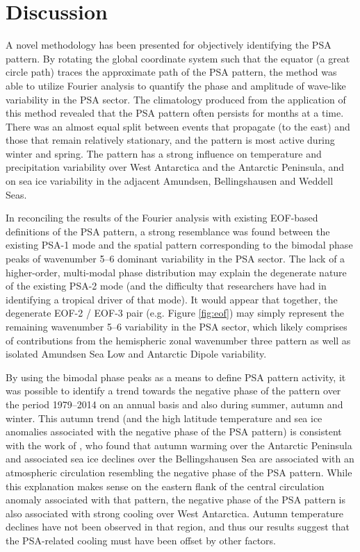 \section{Discussion}

A novel methodology has been presented for objectively identifying the PSA pattern. By rotating the global coordinate system such that the equator (a great circle path) traces the approximate path of the PSA pattern, the method was able to utilize Fourier analysis to quantify the phase and amplitude of wave-like variability in the PSA sector. The climatology produced from the application of this method revealed that the PSA pattern often persists for months at a time. There was an almost equal split between events that propagate (to the east) and those that remain relatively stationary, and the pattern is most active during winter and spring. The pattern has a strong influence on temperature and precipitation variability over West Antarctica and the Antarctic Peninsula, and on sea ice variability in the adjacent Amundsen, Bellingshausen and Weddell Seas. 

In reconciling the results of the Fourier analysis with existing EOF-based definitions of the PSA pattern, a strong resemblance was found between the existing PSA-1 mode and the spatial pattern corresponding to the bimodal phase peaks of wavenumber 5--6 dominant variability in the PSA sector. The lack of a higher-order, multi-modal phase distribution may explain the degenerate nature of the existing PSA-2 mode (and the difficulty that researchers have had in identifying a tropical driver of that mode). It would appear that together, the degenerate EOF-2 / EOF-3 pair (e.g. Figure \ref{fig:eof}) may simply represent the remaining wavenumber 5--6 variability in the PSA sector, which likely comprises of contributions from the hemispheric zonal wavenumber three pattern as well as isolated Amundsen Sea Low and Antarctic Dipole variability.    

By using the bimodal phase peaks as a means to define PSA pattern activity, it was possible to identify a trend towards the negative phase of the pattern over the period 1979--2014 on an annual basis and also during summer, autumn and winter. This autumn trend (and the high latitude temperature and sea ice anomalies associated with the negative phase of the PSA pattern) is consistent with the work of \citet{Ding2013}, who found that autumn warming over the Antarctic Peninsula and associated sea ice declines over the Bellingshausen Sea are associated with an atmospheric circulation resembling the negative phase of the PSA pattern. While this explanation makes sense on the eastern flank of the central circulation anomaly associated with that pattern, the negative phase of the PSA pattern is also associated with strong cooling over West Antarctica. Autumn temperature declines have not been observed in that region, and thus our results suggest that the PSA-related cooling must have been offset by other factors. 

